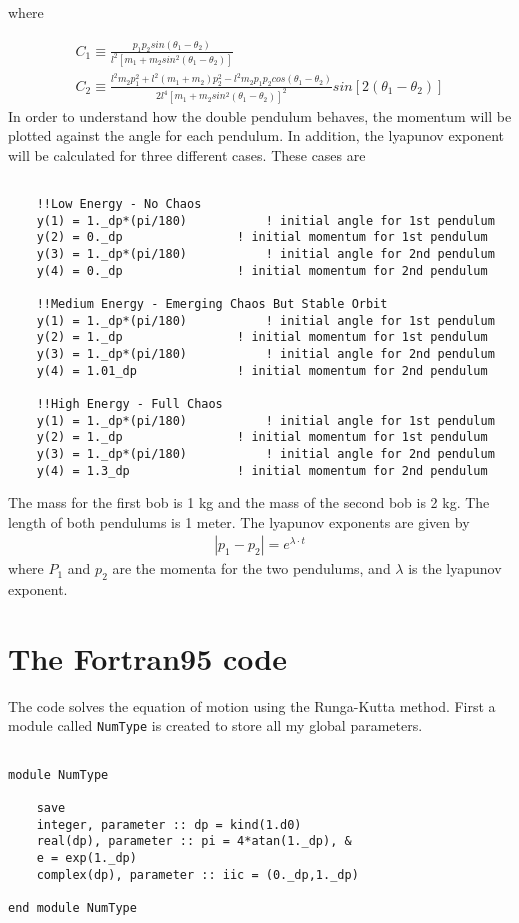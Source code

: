 \documentclass[12pt]{article}
\begin{document}
where

\begin{gather}
C_1 \equiv \frac{p_1p_2sin(\theta_1-\theta_2)}{l^2[m_1+m_2sin^2(\theta_1-\theta_2)]} \\
C_2 \equiv \frac{l^2m_2p_1^2+l^2(m_1+m_2)p_2^2-l^2m_2p_1p_2cos(\theta_1-\theta_2)}{2l^4[m_1+m_2sin^2(\theta_1-\theta_2)]^2}sin[2(\theta_1-\theta_2)]
\end{gather}
In order to understand how the double pendulum behaves, the momentum will be plotted against the angle for each pendulum. In addition, the lyapunov exponent will be calculated for three different cases. These cases are 

\begin{lstlisting}[frame=single,caption={Module {\tt Cases}},label=module]

	!!Low Energy - No Chaos
	y(1) = 1._dp*(pi/180)			! initial angle for 1st pendulum
	y(2) = 0._dp				! initial momentum for 1st pendulum
	y(3) = 1._dp*(pi/180)			! initial angle for 2nd pendulum
	y(4) = 0._dp				! initial momentum for 2nd pendulum

	!!Medium Energy - Emerging Chaos But Stable Orbit
 	y(1) = 1._dp*(pi/180)			! initial angle for 1st pendulum
 	y(2) = 1._dp				! initial momentum for 1st pendulum
  	y(3) = 1._dp*(pi/180)			! initial angle for 2nd pendulum
  	y(4) = 1.01_dp				! initial momentum for 2nd pendulum

	!!High Energy - Full Chaos
 	y(1) = 1._dp*(pi/180)			! initial angle for 1st pendulum
 	y(2) = 1._dp				! initial momentum for 1st pendulum
 	y(3) = 1._dp*(pi/180)			! initial angle for 2nd pendulum
 	y(4) = 1.3_dp				! initial momentum for 2nd pendulum

\end{lstlisting}
The mass for the first bob is 1 kg and the mass of the second bob is 2 kg. The length of both pendulums is 1 meter. The lyapunov exponents are given by
\begin{gather}
|p_1-p_2|=e^{\lambda \cdot t}
\end{gather}
where $P_1$ and $p_2$ are the momenta for the two pendulums, and $\lambda$ is the lyapunov exponent.

\section{The Fortran95 code}

The code solves the equation of motion using the Runga-Kutta method. First a module called {\tt NumType} is created to store all my global parameters.
\begin{lstlisting}[frame=single,caption={Module {\tt NumType}},label=module]

module NumType

	save
	integer, parameter :: dp = kind(1.d0)
	real(dp), parameter :: pi = 4*atan(1._dp), &
	e = exp(1._dp)
	complex(dp), parameter :: iic = (0._dp,1._dp)
	
end module NumType

\end{lstlisting}
\end{document}

